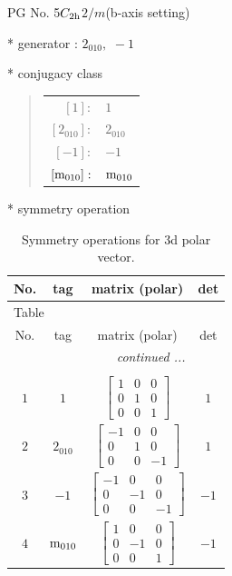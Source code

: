\documentclass[fleqn,8pt]{jsarticle}
\begin{document}
\setcounter{MaxMatrixCols}{32}

\renewcommand{\tablename}{Table~}
\renewcommand{\figurename}{Figure~}
\begin{center}
\LARGE
PG No. 5\quad$C_{\rm 2h}$\quad$2/m$\quad(b-axis setting)\quad[ monoclinic ]
\end{center}

* generator : $2{}_{010},\,\,-1$

* conjugacy class
\begin{quote}
\begin{tabular}{rl}
$ [1]: $ & $ 1 $ \\
$ [2{}_{010}]: $ & $ 2{}_{010} $ \\
$ [-1]: $ & $ -1 $ \\
$ [{\rm m}_{010}]: $ & $ {\rm m}_{010} $
\end{tabular}
\end{quote}

* symmetry operation
\renewcommand{\arraystretch}{1.3}
\begin{longtable}{cccc}
\caption{Symmetry operations for 3d polar vector.}
 \\
 \hline \hline
No. & tag & matrix (polar) & det \\ \hline \endfirsthead

\multicolumn{3}{l}{\tablename\ \thetable{}} \\
 \hline \hline
No. & tag & matrix (polar) & det \\ \hline \endhead

 \hline \hline
\multicolumn{3}{r}{\footnotesize\it continued ...} \\ \endfoot

 \hline \hline
\multicolumn{3}{r}{} \\ \endlastfoot

$ 1 $ & $ 1 $ & $ \begin{bmatrix} 1 & 0 & 0 \\ 0 & 1 & 0 \\ 0 & 0 & 1 \end{bmatrix} $ & $ 1 $ \\ \hline
$ 2 $ & $ 2{}_{010} $ & $ \begin{bmatrix} -1 & 0 & 0 \\ 0 & 1 & 0 \\ 0 & 0 & -1 \end{bmatrix} $ & $ 1 $ \\ \hline
$ 3 $ & $ -1 $ & $ \begin{bmatrix} -1 & 0 & 0 \\ 0 & -1 & 0 \\ 0 & 0 & -1 \end{bmatrix} $ & $ -1 $ \\ \hline
$ 4 $ & $ {\rm m}_{010} $ & $ \begin{bmatrix} 1 & 0 & 0 \\ 0 & -1 & 0 \\ 0 & 0 & 1 \end{bmatrix} $ & $ -1 $ \\
\end{longtable}
\end{document}

